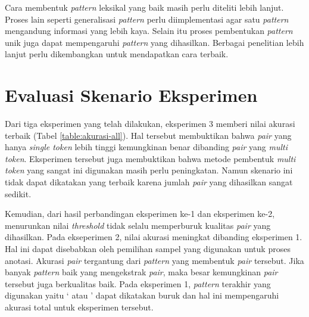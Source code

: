 \begin{itemize}
\end{itemize}

Cara membentuk \textit{pattern} leksikal yang baik masih perlu diteliti lebih lanjut. Proses lain seperti generalisasi \textit{pattern} perlu diimplementasi agar satu \textit{pattern} mengandung informasi yang lebih kaya. Selain itu proses pembentukan \textit{pattern} unik juga dapat mempengaruhi \textit{pattern} yang dihasilkan. Berbagai penelitian lebih lanjut perlu dikembangkan untuk mendapatkan cara terbaik.

\section{Evaluasi Skenario Eksperimen}
Dari tiga eksperimen yang telah dilakukan, eksperimen 3 memberi nilai akurasi terbaik (Tabel \ref{table:akurasi-all}). Hal tersebut membuktikan bahwa \textit{pair} yang hanya \textit{single token} lebih tinggi kemungkinan benar dibanding \textit{pair} yang \textit{multi token}. Eksperimen tersebut juga membuktikan bahwa metode pembentuk \textit{multi token} yang sangat ini digunakan masih perlu peningkatan. Namun skenario ini tidak dapat dikatakan yang terbaik karena jumlah \textit{pair} yang dihasilkan sangat sedikit.

Kemudian, dari hasil perbandingan eksperimen ke-1 dan eksperimen ke-2, menurunkan nilai \textit{threshold} tidak selalu memperburuk kualitas \textit{pair} yang dihasilkan. Pada ekseperimen 2, nilai akurasi meningkat dibanding eksperimen 1. Hal ini dapat disebabkan oleh pemilihan sampel yang digunakan untuk proses anotasi. Akurasi \textit{pair} tergantung dari \textit{pattern} yang membentuk \textit{pair} tersebut. Jika banyak \textit{pattern} baik yang mengekstrak \textit{pair}, maka besar kemungkinan \textit{pair} tersebut juga berkualitas baik. Pada eksperimen 1, \textit{pattern} terakhir yang digunakan yaitu `{\tagHypernym} atau {\tagHyponym}' dapat dikatakan buruk dan hal ini mempengaruhi akurasi total untuk eksperimen tersebut.

